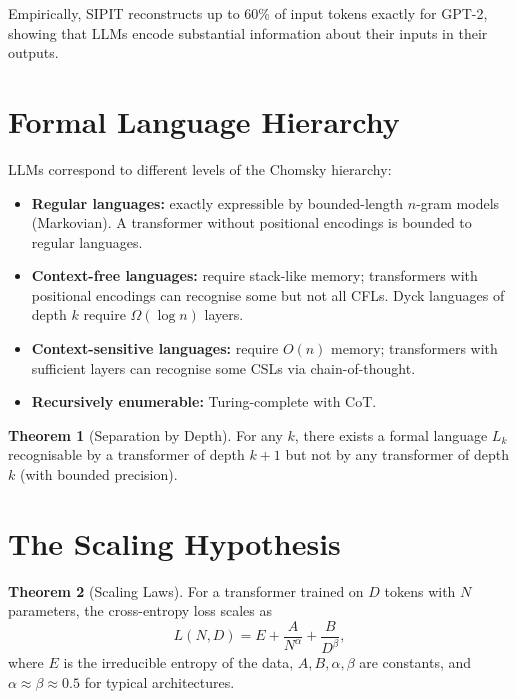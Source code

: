 \documentclass[11pt,a4paper]{book}
\theoremstyle{definition}
\newtheorem{theorem}{Theorem}[chapter]
\begin{document}
Empirically, SIPIT reconstructs up to 60\% of input tokens exactly for GPT-2, showing that LLMs encode substantial information about their inputs in their outputs.

\section{Formal Language Hierarchy}

LLMs correspond to different levels of the Chomsky hierarchy:

\begin{itemize}
	\item \textbf{Regular languages:} exactly expressible by bounded-length $n$-gram models (Markovian). A transformer without positional encodings is bounded to regular languages.
	\item \textbf{Context-free languages:} require stack-like memory; transformers with positional encodings can recognise some but not all CFLs. Dyck languages of depth $k$ require $\Omega(\log n)$ layers.
	\item \textbf{Context-sensitive languages:} require $O(n)$ memory; transformers with sufficient layers can recognise some CSLs via chain-of-thought.
	\item \textbf{Recursively enumerable:} Turing-complete with CoT.
\end{itemize}

\begin{theorem}[Separation by Depth]
	For any $k$, there exists a formal language $L_k$ recognisable by a transformer of depth $k+1$ but not by any transformer of depth $k$ (with bounded precision).
\end{theorem}

\section{The Scaling Hypothesis}

\begin{theorem}[Scaling Laws]
	For a transformer trained on $D$ tokens with $N$ parameters, the cross-entropy loss scales as
	\begin{equation}
		L(N, D) = E + \frac{A}{N^\alpha} + \frac{B}{D^\beta},
	\end{equation}
	where $E$ is the irreducible entropy of the data, $A,B,\alpha,\beta$ are constants, and $\alpha \approx \beta \approx 0.5$ for typical architectures.
\end{theorem}
\end{document}
